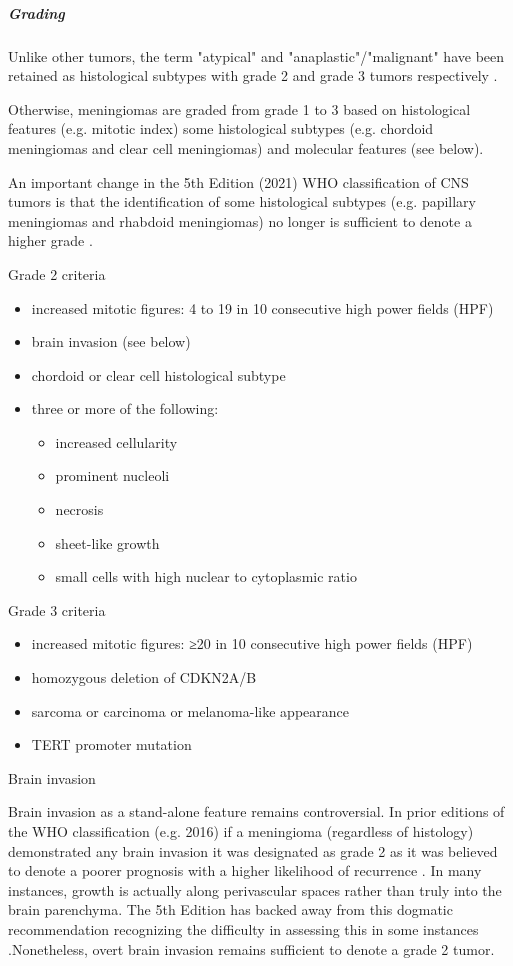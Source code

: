 \subparagraph{Grading}

Unlike other tumors, the term "atypical" and "anaplastic"/"malignant" have been retained as histological subtypes with grade 2 and grade 3 tumors respectively .

Otherwise, meningiomas are graded from grade 1 to 3 based on histological features (e.g. mitotic index) some histological subtypes (e.g. chordoid meningiomas and clear cell meningiomas) and molecular features (see below).

An important change in the 5th Edition (2021) WHO classification of CNS tumors is that the identification of some histological subtypes (e.g. papillary meningiomas and rhabdoid meningiomas) no longer is sufficient to denote a higher grade .

Grade 2 criteria

\begin{itemize}
	\item
	increased mitotic figures: 4 to 19 in 10 consecutive high power fields (HPF)
	\item
	brain invasion (see below)
	\item
	chordoid or clear cell histological subtype
	\item
	three or more of the following:
	
	\begin{itemize}
		\item
		increased cellularity
		\item
		prominent nucleoli
		\item
		necrosis
		\item
		sheet-like growth
		\item
		small cells with high nuclear to cytoplasmic ratio
	\end{itemize}
\end{itemize}

Grade 3 criteria

\begin{itemize}
	\item
	increased mitotic figures: ≥20 in 10 consecutive high power fields (HPF)
	\item
	homozygous deletion of CDKN2A/B
	\item
	sarcoma or carcinoma or melanoma-like appearance
	\item
	TERT promoter mutation
\end{itemize}

Brain invasion

Brain invasion as a stand-alone feature remains controversial. In prior editions of the WHO classification (e.g. 2016) if a meningioma (regardless of histology) demonstrated any brain invasion it was designated as grade 2 as it was believed to denote a poorer prognosis with a higher likelihood of recurrence . In many instances, growth is actually along perivascular spaces rather than truly into the brain parenchyma. The 5th Edition has backed away from this dogmatic recommendation recognizing the difficulty in assessing this in some instances .Nonetheless, overt brain invasion remains sufficient to denote a grade 2 tumor.

